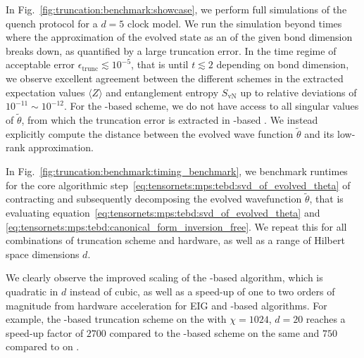 In Fig.~\ref{fig:truncation:benchmark:showcase}, we perform full  simulations of the quench protocol for a $d=5$ clock model.
%
We run the simulation beyond times where the approximation of the evolved state as an  of the given bond dimension breaks down, as quantified by a large truncation error.
%
In the time regime of acceptable error $\epsilon_\text{trunc} \lesssim 10^{-5}$, that is until $t \lesssim 2$ depending on bond dimension, we observe excellent agreement between the different  schemes in the extracted expectation values $\langle Z \rangle$ and entanglement entropy $S_\mathrm{vN}$ up to relative deviations of $10^{-11} \sim 10^{-12}$.
%
For the -based scheme, we do not have access to all singular values of $\tilde\theta$, from which the truncation error is extracted in -based .
%
We instead explicitly compute the distance between the evolved wave function $\tilde\theta$ and its low-rank approximation.






In Fig.~\ref{fig:truncation:benchmark:timing_benchmark}, we benchmark runtimes for the core algorithmic step~\eqref{eq:tensornets:mps:tebd:svd_of_evolved_theta} of contracting and subsequently decomposing the evolved wavefunction $\tilde\theta$, that is evaluating equation~\eqref{eq:tensornets:mps:tebd:svd_of_evolved_theta} and \eqref{eq:tensornets:mps:tebd:canonical_form_inversion_free}.
%
We repeat this for all combinations of truncation scheme and hardware, as well as a range of Hilbert space dimensions $d$.




We clearly observe the improved scaling of the -based algorithm, which is qua\-dra\-tic in $d$ instead of cubic, as well as a speed-up of one to two orders of magnitude from hardware acceleration for EIG and -based algorithms.
%
For example, the -based truncation scheme on the  with $\chi = 1024$, $d=20$ reaches a speed-up factor of $2700$ compared to the -based scheme on the same  and $750$ compared to  on .
